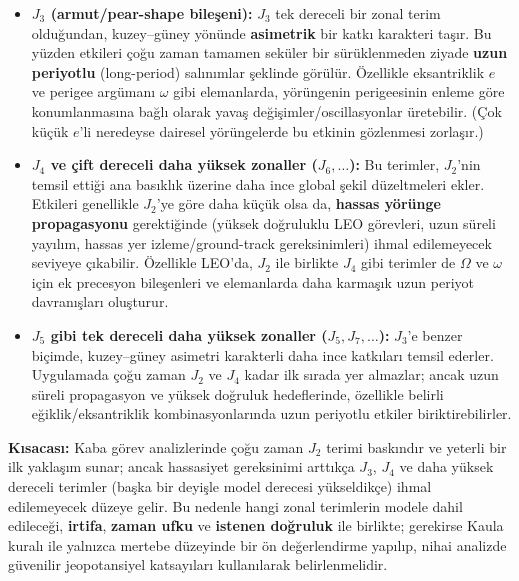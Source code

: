 \begin{itemize}
\item \textbf{$J_3$ (armut/pear-shape bileşeni):}
$J_3$ tek dereceli bir zonal terim olduğundan, kuzey--güney yönünde \textbf{asimetrik} bir katkı karakteri taşır. Bu yüzden etkileri çoğu zaman tamamen seküler bir sürüklenmeden ziyade
\textbf{uzun periyotlu} (long-period) salınımlar şeklinde görülür.
Özellikle eksantriklik $e$ ve perigee argümanı $\omega$ gibi elemanlarda, yörüngenin perigeesinin enleme göre konumlanmasına bağlı olarak yavaş değişimler/oscillasyonlar üretebilir.
(Çok küçük $e$’li neredeyse dairesel yörüngelerde bu etkinin gözlenmesi zorlaşır.)

\item \textbf{$J_4$ ve çift dereceli daha yüksek zonaller ($J_6,\dots$):}
Bu terimler, $J_2$’nin temsil ettiği ana basıklık üzerine
daha ince global şekil düzeltmeleri ekler. Etkileri genellikle $J_2$’ye göre daha küçük olsa da, \textbf{hassas yörünge propagasyonu} gerektiğinde (yüksek doğruluklu LEO görevleri,
uzun süreli yayılım, hassas yer izleme/ground-track gereksinimleri) ihmal edilemeyecek seviyeye çıkabilir.
Özellikle LEO’da, $J_2$ ile birlikte $J_4$ gibi terimler de $\Omega$ ve $\omega$ için ek precesyon bileşenleri ve elemanlarda daha karmaşık uzun periyot davranışları oluşturur.

\item \textbf{$J_5$ gibi tek dereceli daha yüksek zonaller ($J_5,J_7,\dots$):}
$J_3$’e benzer biçimde, kuzey--güney asimetri karakterli daha ince katkıları temsil ederler. Uygulamada çoğu zaman $J_2$ ve $J_4$ kadar ilk sırada yer almazlar; ancak uzun süreli propagasyon ve yüksek doğruluk hedeflerinde, özellikle belirli eğiklik/eksantriklik kombinasyonlarında uzun periyotlu etkiler biriktirebilirler.
\end{itemize}

\noindent
\textbf{Kısacası:}
Kaba görev analizlerinde çoğu zaman $J_2$ terimi baskındır ve yeterli bir ilk yaklaşım sunar; ancak hassasiyet gereksinimi arttıkça $J_3$, $J_4$ ve daha yüksek dereceli terimler
(başka bir deyişle model derecesi yükseldikçe) ihmal edilemeyecek düzeye gelir. Bu nedenle hangi zonal terimlerin modele dahil edileceği, \textbf{irtifa}, \textbf{zaman ufku} ve \textbf{istenen doğruluk} ile birlikte; gerekirse Kaula kuralı ile yalnızca mertebe düzeyinde bir ön değerlendirme yapılıp,
nihai analizde güvenilir jeopotansiyel katsayıları kullanılarak belirlenmelidir.




\newpage
